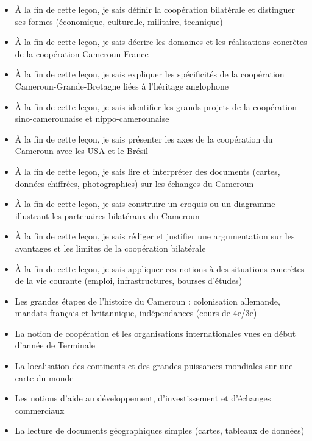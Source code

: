 \documentclass[11pt]{article}
\begin{document}
\begin{objectifs}
\begin{itemize}
\item À la fin de cette leçon, je sais définir la coopération bilatérale et distinguer ses formes (économique, culturelle, militaire, technique)
\item À la fin de cette leçon, je sais décrire les domaines et les réalisations concrètes de la coopération Cameroun-France
\item À la fin de cette leçon, je sais expliquer les spécificités de la coopération Cameroun-Grande-Bretagne liées à l'héritage anglophone
\item À la fin de cette leçon, je sais identifier les grands projets de la coopération sino-camerounaise et nippo-camerounaise
\item À la fin de cette leçon, je sais présenter les axes de la coopération du Cameroun avec les USA et le Brésil
\item À la fin de cette leçon, je sais lire et interpréter des documents (cartes, données chiffrées, photographies) sur les échanges du Cameroun
\item À la fin de cette leçon, je sais construire un croquis ou un diagramme illustrant les partenaires bilatéraux du Cameroun
\item À la fin de cette leçon, je sais rédiger et justifier une argumentation sur les avantages et les limites de la coopération bilatérale
\item À la fin de cette leçon, je sais appliquer ces notions à des situations concrètes de la vie courante (emploi, infrastructures, bourses d'études)
\end{itemize}
\end{objectifs}

\begin{prerequis}
\begin{itemize}
\item Les grandes étapes de l'histoire du Cameroun : colonisation allemande, mandats français et britannique, indépendances (cours de 4e/3e)
\item La notion de coopération et les organisations internationales vues en début d'année de Terminale
\item La localisation des continents et des grandes puissances mondiales sur une carte du monde
\item Les notions d'aide au développement, d'investissement et d'échanges commerciaux
\item La lecture de documents géographiques simples (cartes, tableaux de données)
\end{itemize}
\end{prerequis}
\end{document}
